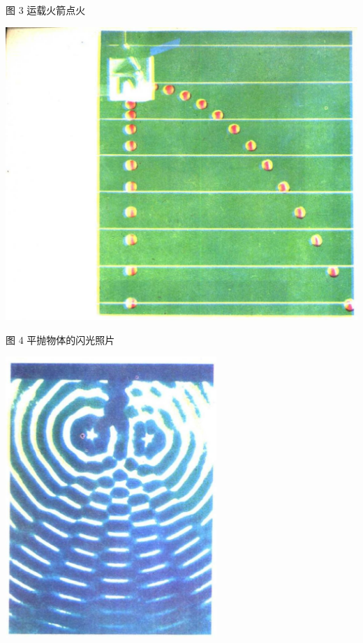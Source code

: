\documentclass[10pt]{article}
\begin{document}
图 3 运载火箭点火

\begin{center}
\includegraphics[max width=1.0\textwidth]{images/01912d55-147c-70aa-b0e0-1782a122f948_4_748731.jpg}
\end{center}

图 4 平抛物体的闪光照片

\begin{center}
\includegraphics[max width=0.6\textwidth]{images/01912d55-147c-70aa-b0e0-1782a122f948_4_150500.jpg}
\end{center}
\end{document}
